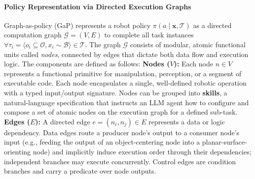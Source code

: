\paragraph{Policy Representation via Directed Execution Graphs}

Graph-as-policy (GaP) represents a robot policy $\pi(a \mid \mathbf{x}, \mathcal{T})$  as a directed computation graph $\mathcal{G} = (V, E)$ to complete all task instances   $\forall \tau_i = \langle o_i \subseteq \mathcal{O}, x_i \sim \mathcal{B} \rangle \in \mathcal{T}$. The graph $\mathcal{G}$ consists of modular, atomic functional units called \emph{nodes}, connected by edges that dictate both data flow and execution logic. The components are defined as follows: \textbf{Nodes ($V$):} Each node $n \in V$ represents a functional primitive for manipulation, perception, or a segment of executable code. Each node encapsulates a single, well-defined robotic operation with a typed input/output signature.
Nodes can be grouped into \textbf{skills},  a natural-language specification that instructs an LLM agent how to configure and compose a set of atomic nodes on the execution graph for a defined sub-task. 
\textbf{Edges ($E$):} A directed edge $e = (n_i, n_j) \in E$ represents a data or logic dependency. {Data edges} route a producer node's output to a consumer node's input (e.g., feeding the output of an object-centering node into a planar-surface-orienting node) and implicitly induce execution order through their dependencies; independent branches may execute concurrently. {Control edges} are condition branches and carry a predicate over node outputs.






